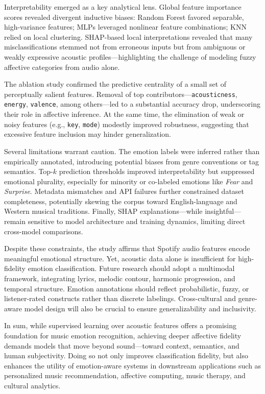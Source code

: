 \documentclass{article}
\begin{document}
Interpretability emerged as a key analytical lens. Global feature importance scores revealed divergent inductive biases: Random Forest favored separable, high-variance features; MLPs leveraged nonlinear feature combinations; KNN relied on local clustering. SHAP-based local interpretations revealed that many misclassifications stemmed not from erroneous inputs but from ambiguous or weakly expressive acoustic profiles—highlighting the challenge of modeling fuzzy affective categories from audio alone.

The ablation study confirmed the predictive centrality of a small set of perceptually salient features. Removal of top contributors—\texttt{acousticness}, \texttt{energy}, \texttt{valence}, among others—led to a substantial accuracy drop, underscoring their role in affective inference. At the same time, the elimination of weak or noisy features (e.g., \texttt{key}, \texttt{mode}) modestly improved robustness, suggesting that excessive feature inclusion may hinder generalization.

Several limitations warrant caution. The emotion labels were inferred rather than empirically annotated, introducing potential biases from genre conventions or tag semantics. Top-$k$ prediction thresholds improved interpretability but suppressed emotional plurality, especially for minority or co-labeled emotions like \textit{Fear} and \textit{Surprise}. Metadata mismatches and API failures further constrained dataset completeness, potentially skewing the corpus toward English-language and Western musical traditions. Finally, SHAP explanations—while insightful—remain sensitive to model architecture and training dynamics, limiting direct cross-model comparisons.

Despite these constraints, the study affirms that Spotify audio features encode meaningful emotional structure. Yet, acoustic data alone is insufficient for high-fidelity emotion classification. Future research should adopt a multimodal framework, integrating lyrics, melodic contour, harmonic progression, and temporal structure. Emotion annotations should reflect probabilistic, fuzzy, or listener-rated constructs rather than discrete labelings. Cross-cultural and genre-aware model design will also be crucial to ensure generalizability and inclusivity.

In sum, while supervised learning over acoustic features offers a promising foundation for music emotion recognition, achieving deeper affective fidelity demands models that move beyond sound—toward context, semantics, and human subjectivity. Doing so not only improves classification fidelity, but also enhances the utility of emotion-aware systems in downstream applications such as personalized music recommendation, affective computing, music therapy, and cultural analytics.
\end{document}
